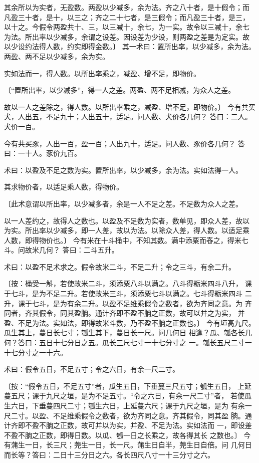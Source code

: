 \documentclass[a4paper,12pt,UTF8,twoside]{ctexbook}
\begin{document}
其余所以为实者，无盈数。两盈以少减多，余为法。齐之八十者，是十假令；而 凡盈三十者，是十，以三之；齐之二十七者，是三假令；而凡盈三十者，是三， 以十之。今假令两盈共十、三，以三减十，余七，为一实。故令以三减十，余七 为法。所出率以少减多，余谓之设差。因设差为少设，则两盈之差是为定实。故 以少设约法得人数，约实即得金数。〕 其一术曰：置所出率，以少减多，余为法。两盈、两不足以少减多，余为实。

实如法而一，得人数。以所出率乘之，减盈、增不足，即物价。

〔“置所出率，以少减多”，得一人之差。两盈、两不足相减，为众人之差。

故以一人之差除之，得人数。以所出率乘之，减盈、增不足，即物价。〕 今有共买犬，人出五，不足九十；人出五十，适足。问人数、犬价各几何？ 答曰：二人。犬价一百。

今有共买豕，人出一百，盈一百；人出九十，适足。问人数、豕价各几何？ 答曰：一十人。豕价九百。

术曰：以盈及不足之数为实。置所出率，以少减多，余为法。实如法得一人。

其求物价者，以适足乘人数，得物价。

〔此术意谓以所出率，以少减多者，余是一人不足之差。不足数为众人之差。

以一人差约之，故得人之数也。以盈及不足数为实者，数单见，即众人差，故以 为实。所出率以少减多，即一人差，故以为法。以除众人差，得人数。以适足乘 人数，即得物价也。〕 今有米在十斗桶中，不知其数。满中添粟而舂之，得米七斗。问故米几何？ 答曰：二斗五升。

术曰：以盈不足术求之。假令故米二斗，不足二升；令之三斗，有余二升。

〔按：桶受一斛，若使故米二斗，须添粟八斗以满之。八斗得粝米四斗八升， 课于七斗，是为不足二升。若使故米三斗，须添粟七斗以满之。七斗得粝米四斗 二升，课于七斗，是为有余二升。以盈不足维乘假令之数者，欲为齐同之意。为 齐同者，齐其假令，同其盈朒。通计齐即不盈不朒之正数，故可以并之为实， 并盈、不足为法。实如法，即得故米斗数，乃不盈不朒之正数也。〕 今有垣高九尺。瓜生其上，蔓日长七寸；瓠生其下，蔓日长一尺。问几何日 相逢？瓜、瓠各长几何？答曰：五日十七分日之五。瓜长三尺七寸一十七分寸之 一。瓠长五尺二寸一十七分寸之一十六。

术曰：假令五日，不足五寸；令之六日，有余一尺二寸。

〔按：“假令五日，不足五寸”者，瓜生五日，下垂蔓三尺五寸；瓠生五日， 上延蔓五尺；课于九尺之垣，是为不足五寸。“令之六日，有余一尺二寸”者， 若使瓜生六日，下垂蔓四尺二寸；瓠生六日，上延蔓六尺；课于九尺之垣，是为 有余一尺二寸。以盈、不足维乘假令之数者，欲为齐同之意。齐其假令，同其盈 朒。通计齐即不盈不朒之正数，故可并以为实，并盈、不足为法。实如法而 一，即设差不盈不朒之正数，即得日数。以瓜、瓠一日之长乘之，故各得其长 之数也。〕 今有蒲生一日，长三尺；莞生一日，长一尺。蒲生日自半，莞生日自倍。问 几何日而长等？答曰：二日十三分日之六。各长四尺八寸一十三分寸之六。
\end{document}

